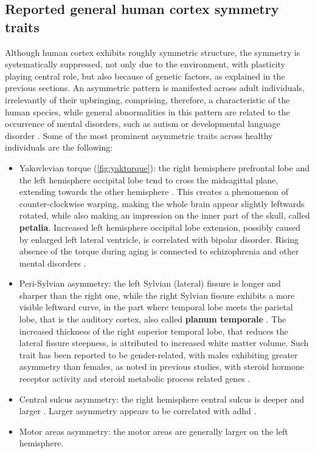\subsection{Reported general human cortex symmetry traits}
Although human cortex exhibits roughly symmetric structure, the symmetry is systematically suppressed, not only due to the environment, with plasticity playing central role, but also because of genetic factors, as explained in the previous sections. An asymmetric pattern is manifested across adult individuals, irrelevantly of their upbringing, comprising, therefore, a characteristic of the human species, while general abnormalities in this pattern are related to the occurrence of mental disorders, such as autism or developmental language disorder \cite{Herbert2005,Kong2022}. Some of the most prominent asymmetric traits across healthy individuals are the following:
\begin{itemize}
	\item{Yakovlevian torque (\autoref{fig:yaktorque}): the right hemisphere prefrontal lobe and the left hemisphere occipital lobe tend to cross the midsagittal plane, extending towards the other hemisphere \cite{Kuo2022}. This creates a phenomenon of counter-clockwise warping, making the whole brain appear slightly leftwards rotated, while also making an impression on the inner part of the skull, called \textbf{petalia}. Increased left hemisphere occipital lobe extension, possibly caused by enlarged left lateral ventricle, is correlated with bipolar disorder\cite{Maller2015}. Rising absence of the torque during aging is connected to schizophrenia  and other mental disorders \cite{Ribolsi2014}.}
	\item{Peri-Sylvian asymmetry: the left Sylvian (lateral) fissure is longer and sharper than the right one, while the right Sylvian fissure exhibits a more visible leftward curve, in the part where temporal lobe meets the parietal lobe, that is the auditory cortex, also called \textbf{planum temporale} \cite{Kuo2022}. The increased thickness of the right superior temporal lobe, that reduces the lateral fissure steepness, is attributed to increased white matter volume. Such trait has been reported to be gender-related, with males exhibiting greater asymmetry than females, as noted in previous studies, with steroid hormone receptor activity and steroid metabolic process related genes \cite{Guadalupe2015}.}
	\item{Central sulcus asymmetry: the right hemisphere central sulcus is deeper and larger \cite{Kuo2022}. Larger asymmetry appears to be correlated with \ac{adhd} \cite{Li2015}.}
	\item{Motor areas asymmetry: the motor areas are generally larger on the left hemisphere.}
\end{itemize}

